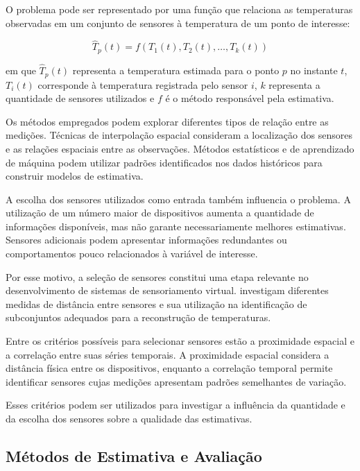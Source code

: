 O problema pode ser representado por uma função que relaciona
as temperaturas observadas em um conjunto de sensores à
temperatura de um ponto de interesse:

\begin{equation}
    \hat{T}_{p}(t) =
    f\left(T_1(t), T_2(t), \ldots, T_k(t)\right)
    \label{eq:sensoriamento_virtual}
\end{equation}

\noindent
em que $\hat{T}_{p}(t)$ representa a temperatura estimada para
o ponto $p$ no instante $t$, $T_i(t)$ corresponde à temperatura
registrada pelo sensor $i$, $k$ representa a quantidade de sensores
utilizados e $f$ é o método responsável pela estimativa.

Os métodos empregados podem explorar diferentes tipos de relação
entre as medições. Técnicas de interpolação espacial consideram
a localização dos sensores e as relações espaciais entre as
observações. Métodos estatísticos e de aprendizado de máquina
podem utilizar padrões identificados nos dados históricos
para construir modelos de estimativa.

A escolha dos sensores utilizados como entrada também influencia
o problema. A utilização de um número maior de dispositivos
aumenta a quantidade de informações disponíveis, mas não
garante necessariamente melhores estimativas. Sensores
adicionais podem apresentar informações redundantes ou
comportamentos pouco relacionados à variável de interesse.

Por esse motivo, a seleção de sensores constitui uma etapa
relevante no desenvolvimento de sistemas de sensoriamento
virtual.  investigam
diferentes medidas de distância entre sensores e sua
utilização na identificação de subconjuntos adequados
para a reconstrução de temperaturas.

Entre os critérios possíveis para selecionar sensores
estão a proximidade espacial e a correlação entre suas
séries temporais. A proximidade espacial considera a
distância física entre os dispositivos, enquanto a
correlação temporal permite identificar sensores cujas
medições apresentam padrões semelhantes de variação.

Esses critérios podem ser utilizados para investigar
a influência da quantidade e da escolha dos sensores
sobre a qualidade das estimativas.


\subsection{Métodos de Estimativa e Avaliação}
\label{subsec:metodos_estimativa}

